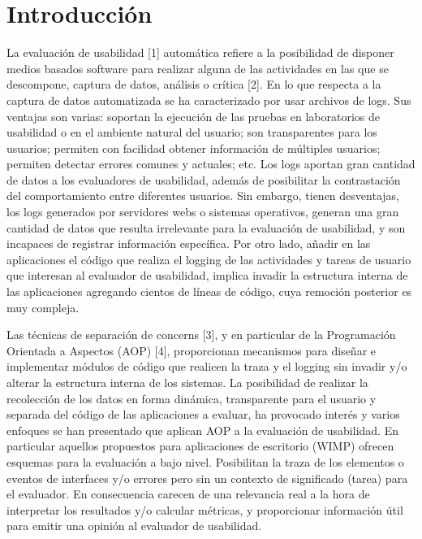 \section{Introducción}
\label{sec:intro}

La evaluación de usabilidad [1] automática refiere a la posibilidad de disponer medios basados software para realizar alguna de las actividades en las que se descompone, captura de datos, análisis o crítica [2]. En lo que respecta a la captura de datos automatizada se ha caracterizado por usar archivos de logs. Sus ventajas son varias: soportan la ejecución de las pruebas en laboratorios de usabilidad o en el ambiente natural del usuario; son transparentes para los usuarios; permiten con facilidad obtener información de múltiples usuarios; permiten detectar errores comunes y actuales; etc. Los logs aportan gran cantidad de datos a los evaluadores de usabilidad, además de posibilitar la contrastación del comportamiento entre diferentes usuarios. Sin embargo, tienen desventajas, los logs generados por servidores webs o sistemas operativos, generan una gran cantidad de datos que resulta irrelevante para la evaluación de usabilidad, y son incapaces de registrar información específica. Por otro lado, añadir en las aplicaciones el código que realiza el logging de las actividades y  tareas de usuario que interesan al evaluador de usabilidad, implica invadir la estructura interna de las aplicaciones agregando cientos de líneas de código, cuya remoción posterior es muy compleja.

Las técnicas de separación de concerns [3], y en particular de la Programación Orientada a Aspectos (AOP) [4], proporcionan mecanismos para diseñar e implementar módulos de código que realicen la traza y el logging sin invadir y/o alterar la estructura interna de los sistemas. La posibilidad de realizar la recolección de los datos en forma dinámica, transparente para el usuario y separada del código de las aplicaciones a evaluar, ha provocado interés y varios enfoques se han presentado que aplican AOP a la evaluación de usabilidad. En particular aquellos propuestos para aplicaciones de escritorio (WIMP) ofrecen esquemas para la evaluación a bajo nivel. Posibilitan la traza de los elementos o eventos de interfaces y/o errores pero sin un contexto de significado (tarea) para el evaluador. En consecuencia carecen de una relevancia real a la hora de interpretar los resultados y/o calcular métricas, y proporcionar información útil para emitir una opinión al evaluador de usabilidad. 

